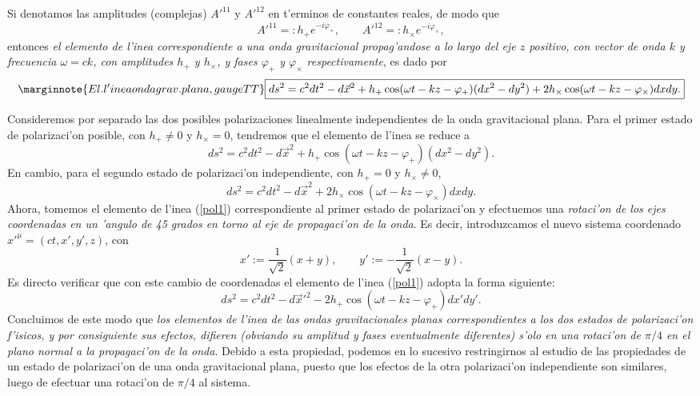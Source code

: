 Si denotamos las amplitudes (complejas) $A'^{11}$ y $A'^{12}$ en t'erminos de constantes reales, de modo que
\begin{equation}
A'^{11}=:h_+e^{-i\varphi_+}, \qquad A'^{12}=:h_\times e^{-i\varphi_\times},
\end{equation}
entonces \textit{el elemento de l'inea correspondiente a una onda gravitacional propag'andose a lo largo del eje $z$ positivo, con vector de onda $k$ y frecuencia $\omega=ck$, con amplitudes $h_+$ y $h_\times$, y fases $\varphi_+$ y $\varphi_\times$ respectivamente}, es dado por
\begin{equation}\marginnote{El. l'inea onda grav. plana, gauge TT}
 \boxed{ds^2=c^2dt^2-d\vec{x}^2+h_+\cos(\omega t-kz-\varphi_+)(dx^2-dy^2)+2h_\times\cos(\omega t-kz-\varphi_\times)dxdy .}
\end{equation}

Consideremos por separado las dos posibles polarizaciones linealmente independientes de la onda gravitacional plana. Para el primer estado de polarizaci'on posible, con $h_+\neq 0$ y $h_\times=0$, tendremos que el elemento de l'inea se reduce a
\begin{equation}\label{pol1}
 ds^2=c^2dt^2-d\vec{x}^2+h_+\cos(\omega t-kz-\varphi_+)(dx^2-dy^2).
\end{equation}
En cambio, para el segundo estado de polarizaci'on independiente, con $h_+=0$ y $h_\times\neq 0$,
\begin{equation}\label{pol2}
 ds^2=c^2dt^2-d\vec{x}^2+2h_\times\cos(\omega t-kz-\varphi_\times)dxdy.
\end{equation}
Ahora, tomemos el elemento de l'inea (\ref{pol1}) correspondiente al primer estado de polarizaci'on y efectuemos una \textit{rotaci'on de los ejes coordenadas en un 'angulo de 45 grados en torno al eje de propagaci'on de la onda}. Es decir, introduzcamos el nuevo sistema coordenado $x'^\mu=(ct,x',y',z)$, con
\begin{equation}
 x':=\frac{1}{\sqrt{2}}(x+y), \qquad y':=-\frac{1}{\sqrt{2}}(x-y).
\end{equation}
Es directo verificar que con este cambio de coordenadas el elemento de l'inea (\ref{pol1}) adopta la forma siguiente:
\begin{equation}
 ds^2=c^2dt^2-d\vec{x}'^2-2h_+\cos(\omega t-kz-\varphi_+)dx'dy'.
\end{equation}
Concluimos de este modo que \textit{los elementos de l'inea de las ondas gravitacionales planas correspondientes a los dos estados de polarizaci'on f'isicos, y por consiguiente sus efectos, difieren (obviando su amplitud y fases eventualmente diferentes) s'olo en una rotaci'on de $\pi/4$ en el plano normal a la propagaci'on de la onda}. Debido a esta propiedad, podemos en lo sucesivo restringirnos al estudio de las propiedades de un estado de polarizaci'on de una onda gravitacional plana, puesto que los efectos de la otra polarizaci'on independiente son similares, luego de efectuar una rotaci'on de $\pi/4$ al sistema.

